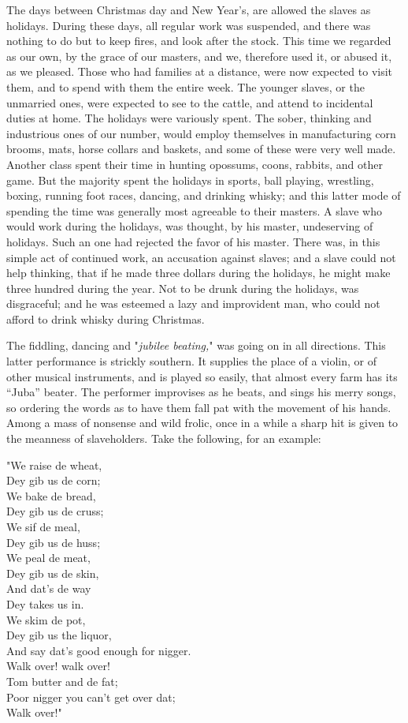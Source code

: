 The days between Christmas day and New Year's, are allowed the slaves as
holidays. During these days, all regular work was suspended, and there
was nothing to do but to keep fires, and look after the stock. This time
we regarded as our own, by the grace of our masters, and we, therefore
used it, or abused it, as we pleased. Those who had families at a
distance, were now expected to visit them, and to spend with them the
entire week. The younger slaves, or the unmarried ones, were expected to
see to the cattle, and attend to incidental duties at home. The holidays
were variously spent. The sober, thinking and industrious ones of our
number, would employ themselves in manufacturing corn brooms, mats,
horse collars and baskets, and some of these were very well made.
Another class spent their time in hunting {}opossums, coons, rabbits,
and other game. But the majority spent the holidays in sports, ball
playing, wrestling, boxing, running foot races, dancing, and drinking
whisky; and this latter mode of spending the time was generally most
agreeable to their masters. A slave who would work during the holidays,
was thought, by his master, undeserving of holidays. Such an one had
rejected the favor of his master. There was, in this simple act of
continued work, an accusation against slaves; and a slave could not help
thinking, that if he made three dollars during the holidays, he might
make three hundred during the year. Not to be drunk during the holidays,
was disgraceful; and he was esteemed a lazy and improvident man, who
could not afford to drink whisky during Christmas.

The fiddling, dancing and "\emph{jubilee beating,}" was going on in all
directions. This latter performance is strickly southern. It supplies
the place of a violin, or of other musical instruments, and is played so
easily, that almost every farm has its ``Juba'' beater. The performer
improvises as he beats, and sings his merry songs, so ordering the words
as to have them fall pat with the movement of his hands. Among a mass of
nonsense and wild frolic, once in a while a sharp hit is given to the
meanness of slaveholders. Take the following, for an example:

{"}We raise de wheat,\\
Dey gib us de corn;\\
We bake de bread,\\
Dey gib us de cruss;\\
We sif de meal,\\
Dey gib us de huss;\\
{}We peal de meat,\\
Dey gib us de skin,\\
And dat's de way\\
Dey takes us in.\\
We skim de pot,\\
Dey gib us the liquor,\\
And say dat's good enough for nigger.\\
{﻿}Walk over! walk over!\\
{﻿}Tom butter and de fat;\\
{﻿}Poor nigger you can't get over dat;\\
{﻿}Walk over!"\\

